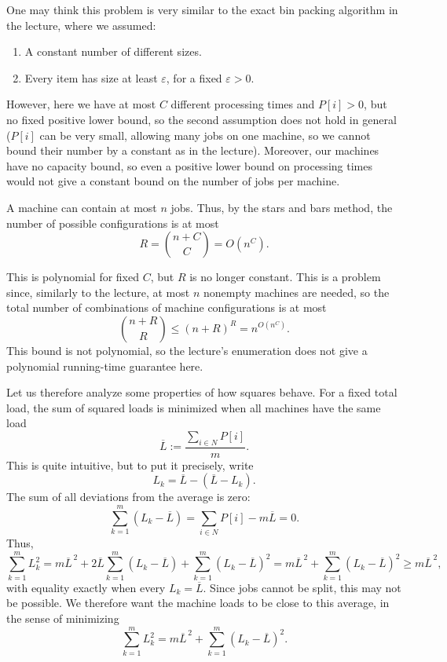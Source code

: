 \documentclass[12pt,a4paper]{article}
\begin{document}
One may think this problem is very similar to the exact bin packing algorithm
in the lecture, where we assumed:
\begin{enumerate}
\item A constant number of different sizes.
\item Every item has size at least $\varepsilon$, for a fixed $\varepsilon>0$.
\end{enumerate}
However, here we have at most $C$
different processing times and $P[i]>0$, but no fixed positive lower bound,
so the second assumption does not hold in general ($P[i]$ can be very
small, allowing many jobs on one machine, so we cannot bound their number
by a constant as in the lecture).
Moreover, our machines have no capacity bound, so even a positive lower
bound on processing times would not give a constant bound on the number
of jobs per machine.

A machine can contain at most $n$ jobs.
Thus, by the stars and bars method, the number of possible configurations
is at most
\[
R=\binom{n+C}{C}=O(n^C).
\]

This is polynomial for fixed $C$, but $R$ is no longer constant.
This is a problem since, similarly to the lecture, at most $n$ nonempty
machines are needed, so the total number of combinations of machine
configurations is at most
\[
\binom{n+R}{R}\leq(n+R)^R=n^{O(n^C)}.
\]
This bound is not polynomial, so the lecture's enumeration does not give
a polynomial running-time guarantee here.

Let us therefore analyze some properties of how squares behave.
For a fixed total load, the sum of
squared loads is minimized when all machines have the same load
\[
\overline{L}:=\frac{\sum_{i\in N}P[i]}{m}.
\]
This is quite intuitive, but to put it precisely, write
\[
L_k=\overline{L}-(\overline{L}-L_k).
\]
The sum of all deviations
from the average is zero:
\[
\sum_{k=1}^{m}(L_k-\overline{L})
=\sum_{i\in N}P[i]-m\overline{L}=0.
\]
Thus,
\begin{equation}
\label{eq:scheduling-average-load-bound}
\sum_{k=1}^{m}L_k^2
=m\overline{L}^{\,2}+2\overline{L}\sum_{k=1}^{m}(L_k-\overline{L})
+\sum_{k=1}^{m}(L_k-\overline{L})^2
=m\overline{L}^{\,2}+\sum_{k=1}^{m}(L_k-\overline{L})^2
\geq m\overline{L}^{\,2},
\end{equation}
with equality exactly when every $L_k=\overline{L}$.
Since jobs cannot be split, this may not be possible. We therefore want the
machine loads to be close to this average, in the sense of minimizing
\[
\sum_{k=1}^{m}L_k^2
=m\overline{L}^{\,2}+\sum_{k=1}^{m}(L_k-\overline{L})^2.
\]
\end{document}
